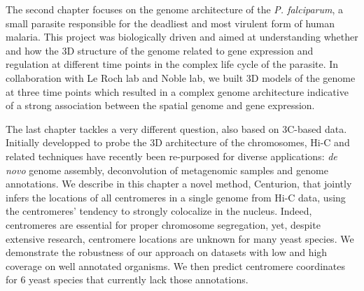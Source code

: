 \begin{abstracts}
The second chapter focuses on the genome architecture of the {\em P.
falciparum}, a small parasite responsible for the deadliest and most virulent
form of human malaria. This project was biologically driven and aimed at
understanding whether and how the 3D structure of the genome related to gene
expression and regulation at different time points in the complex life cycle
of the parasite. In collaboration with Le Roch lab and Noble lab, we built 3D
models of the genome at three time points which resulted in a complex genome
architecture indicative of a strong association between the spatial genome and
gene expression.

The last chapter tackles a very different question, also based on 3C-based
data. Initially developped to probe the 3D architecture of the chromosomes,
Hi-C and related techniques have recently been re-purposed for diverse
applications: \textit{de novo} genome assembly, deconvolution of metagenomic
samples and genome annotations. We describe in this chapter a novel method,
Centurion, that jointly infers the locations of all centromeres in a single
genome from Hi-C data, using the centromeres' tendency to strongly colocalize
in the nucleus.  Indeed, centromeres are essential for proper chromosome
segregation, yet, despite extensive research, centromere locations are unknown
for many yeast species. We demonstrate the robustness of our approach on
datasets with low and high coverage on well annotated organisms. We then
predict centromere coordinates for 6 yeast species that currently lack those
annotations.

\end{abstracts}


